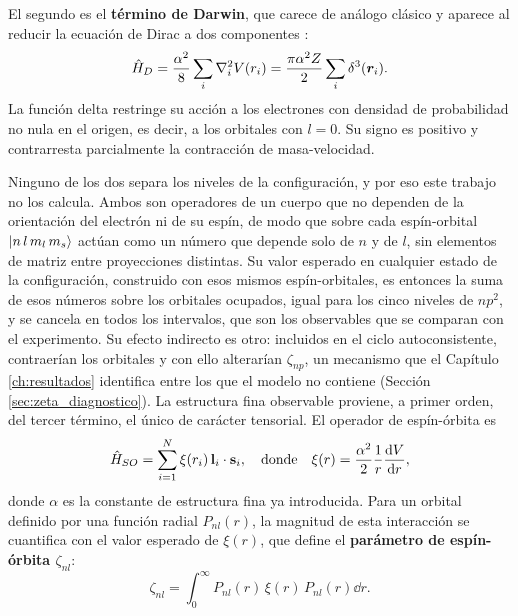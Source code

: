 El segundo es el \textbf{término de Darwin}, que carece de análogo clásico y aparece al reducir la ecuación de Dirac a dos componentes \parencite{Foldy1950}:
\begin{equation}
    \label{eq:h_darwin}
    \hat{H}_{D} = \frac{\alpha^2}{8}\sum_i \laplacian_i V(r_i) = \frac{\pi \alpha^2 Z}{2}\sum_i \delta^3(\bm{r}_i).
\end{equation}
La función delta restringe su acción a los electrones con densidad de probabilidad no nula en el origen, es decir, a los orbitales con $l=0$. Su signo es positivo y contrarresta parcialmente la contracción de masa-velocidad.

Ninguno de los dos separa los niveles de la configuración, y por eso este trabajo no los calcula. Ambos son operadores de un cuerpo que no dependen de la orientación del electrón ni de su espín, de modo que sobre cada espín-orbital $\ket{n\,l\,m_l\,m_s}$ actúan como un número que depende solo de $n$ y de $l$, sin elementos de matriz entre proyecciones distintas. Su valor esperado en cualquier estado de la configuración, construido con esos mismos espín-orbitales, es entonces la suma de esos números sobre los orbitales ocupados, igual para los cinco niveles de $np^2$, y se cancela en todos los intervalos, que son los observables que se comparan con el experimento. Su efecto indirecto es otro: incluidos en el ciclo autoconsistente, contraerían los orbitales y con ello alterarían $\zeta_{np}$, un mecanismo que el Capítulo \ref{ch:resultados} identifica entre los que el modelo no contiene (Sección \ref{sec:zeta_diagnostico}). La estructura fina observable proviene, a primer orden, del tercer término, el único de carácter tensorial. El operador de espín-órbita es
\begin{equation}
    \hat{H}_{SO} = \sum_{i=1}^N \xi(r_i) \, \mathbf{l}_i \cdot \mathbf{s}_i, \quad \text{donde} \quad \xi(r) = \frac{\alpha^2}{2} \frac{1}{r} \dv{V}{r},
\end{equation}
donde $\alpha$ es la constante de estructura fina ya introducida. Para un orbital definido por una función radial $P_{nl}(r)$, la magnitud de esta interacción se cuantifica con el valor esperado de $\xi(r)$, que define el \textbf{parámetro de espín-órbita $\zeta_{nl}$}:
\begin{equation}
    \label{eq:zeta_spin_orbit}
    \zeta_{nl} = \int_0^\infty P_{nl}(r) \, \xi(r) \, P_{nl}(r) \dd{r} .
\end{equation}
